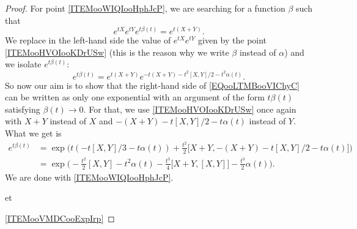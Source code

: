 \begin{proof}
	For point \ref{ITEMooWIQIooHphJcP}, we are searching for a function \( \beta\) such that
	\begin{equation}
		e^{tX} e^{tY} e^{t\beta(t)}= e^{t(X+Y)}.
	\end{equation}
	We replace in the left-hand side the value of \(  e^{tX} e^{tY}\) given by the point \ref{ITEMooHVOIooKDrUSw} (this is the reason why we write \( \beta\) instead of \( \alpha\)) and we isolate \(  e^{t\beta(t)}\):
	\begin{equation}        \label{EQooLTMBooVIChyC}
		e^{t\beta(t)}= e^{t(X+Y)} e^{-t(X+Y)-t^2[X,Y]/2-t^2\alpha(t)}.
	\end{equation}
	So now our aim is to show that the right-hand side of \eqref{EQooLTMBooVIChyC} can be written as only one exponential with an argument of the form \( t\beta(t)\) satisfying \( \beta(t)\to 0\). For that, we use \ref{ITEMooHVOIooKDrUSw} once again with \( X+Y\) instead of \( X\) and \( -(X+Y)-t[X,Y]/2-t\alpha(t)\) instead of \( Y\). What we get is
	\begin{subequations}
		\begin{align}
			e^{t\beta(t)} & =\exp\big( t(-t[X,Y]/3-t\alpha(t))+\frac{ t^2 }{2}\big[ X+Y,-(X+Y)-t[X,Y]/2-t\alpha(t) \big] \big)                        \\
			              & =\exp\big( -\frac{ t^2 }{2}[X,Y]  -t^2\alpha(t)-\frac{ t^3 }{ 4 }\big[ X+Y,[X,Y] \big]-\frac{ t^3 }{ 2 }\alpha(t)  \big).
		\end{align}
	\end{subequations}
	We are done with \ref{ITEMooWIQIooHphJcP}.

	et

	\ref{ITEMooVMDCooExpIrp}

\end{proof}
